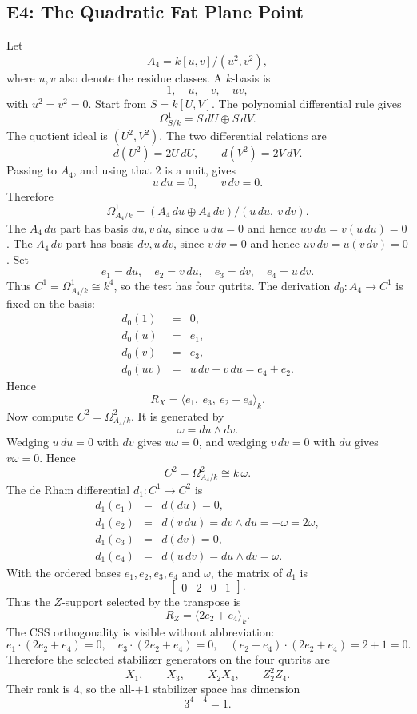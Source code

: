 \subsection{E4: The Quadratic Fat Plane Point}
Let
\[
  A_4=k[u,v]/(u^2,v^2),
\]
where \(u,v\) also denote the residue classes.  A \(k\)-basis is
\[
  1,\quad u,\quad v,\quad uv,
\]
with \(u^2=v^2=0\).  Start from \(S=k[U,V]\).  The polynomial differential
rule gives
\[
  \Omega^1_{S/k}=S\,dU\oplus S\,dV.
\]
The quotient ideal is \((U^2,V^2)\).  The two differential relations are
\[
  d(U^2)=2U\,dU,\qquad d(V^2)=2V\,dV.
\]
Passing to \(A_4\), and using that \(2\) is a unit, gives
\[
  u\,du=0,\qquad v\,dv=0.
\]
Therefore
\[
  \Omega^1_{A_4/k}
  =
  (A_4\,du\oplus A_4\,dv)/(u\,du,\ v\,dv).
\]
The \(A_4\,du\) part has basis \(du,v\,du\), since \(u\,du=0\) and hence
\(uv\,du=v(u\,du)=0\).  The \(A_4\,dv\) part has basis \(dv,u\,dv\), since
\(v\,dv=0\) and hence \(uv\,dv=u(v\,dv)=0\).  Set
\[
  e_1=du,\quad e_2=v\,du,\quad e_3=dv,\quad e_4=u\,dv.
\]
Thus \(C^1=\Omega^1_{A_4/k}\cong k^4\), so the test has four qutrits.
The derivation \(d_0:A_4\to C^1\) is fixed on the basis:
\[
\begin{array}{rcl}
d_0(1)&=&0,\\
d_0(u)&=&e_1,\\
d_0(v)&=&e_3,\\
d_0(uv)&=&u\,dv+v\,du=e_4+e_2.
\end{array}
\]
Hence
\[
  R_X=\langle e_1,\ e_3,\ e_2+e_4\rangle_k.
\]
Now compute \(C^2=\Omega^2_{A_4/k}\).  It is generated by
\[
  \omega=du\wedge dv.
\]
Wedging \(u\,du=0\) with \(dv\) gives \(u\omega=0\), and wedging
\(v\,dv=0\) with \(du\) gives \(v\omega=0\).  Hence
\[
  C^2=\Omega^2_{A_4/k}\cong k\,\omega.
\]
The de Rham differential \(d_1:C^1\to C^2\) is
\[
\begin{array}{rcl}
d_1(e_1)&=&d(du)=0,\\
d_1(e_2)&=&d(v\,du)=dv\wedge du=-\omega=2\omega,\\
d_1(e_3)&=&d(dv)=0,\\
d_1(e_4)&=&d(u\,dv)=du\wedge dv=\omega.
\end{array}
\]
With the ordered bases \(e_1,e_2,e_3,e_4\) and \(\omega\), the matrix of
\(d_1\) is
\[
  \begin{bmatrix}0&2&0&1\end{bmatrix}.
\]
Thus the \(Z\)-support selected by the transpose is
\[
  R_Z=\langle 2e_2+e_4\rangle_k.
\]
The CSS orthogonality is visible without abbreviation:
\[
  e_1\cdot(2e_2+e_4)=0,\quad
  e_3\cdot(2e_2+e_4)=0,\quad
  (e_2+e_4)\cdot(2e_2+e_4)=2+1=0.
\]
Therefore the selected stabilizer generators on the four qutrits are
\[
  X_1,\qquad X_3,\qquad X_2X_4,\qquad Z_2^2Z_4.
\]
Their rank is \(4\), so the all-\(+1\) stabilizer space has dimension
\[
  3^{4-4}=1.
\]
